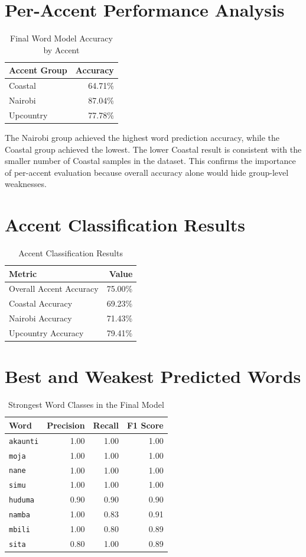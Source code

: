 \documentclass[12pt,a4paper]{report}
\begin{document}
\section{Per-Accent Performance Analysis}
\begin{table}[H]
\centering
\caption{Final Word Model Accuracy by Accent}
\begin{tabular}{lr}
\toprule
\textbf{Accent Group} & \textbf{Accuracy}\\
\midrule
Coastal & 64.71\%\\
Nairobi & 87.04\%\\
Upcountry & 77.78\%\\
\bottomrule
\end{tabular}
\end{table}

The Nairobi group achieved the highest word prediction accuracy, while the Coastal group achieved the lowest. The lower Coastal result is consistent with the smaller number of Coastal samples in the dataset. This confirms the importance of per-accent evaluation because overall accuracy alone would hide group-level weaknesses.

\section{Accent Classification Results}
\begin{table}[H]
\centering
\caption{Accent Classification Results}
\begin{tabular}{lr}
\toprule
\textbf{Metric} & \textbf{Value}\\
\midrule
Overall Accent Accuracy & 75.00\%\\
Coastal Accuracy & 69.23\%\\
Nairobi Accuracy & 71.43\%\\
Upcountry Accuracy & 79.41\%\\
\bottomrule
\end{tabular}
\end{table}

\section{Best and Weakest Predicted Words}
\begin{table}[H]
\centering
\caption{Strongest Word Classes in the Final Model}
\begin{tabular}{lrrr}
\toprule
\textbf{Word} & \textbf{Precision} & \textbf{Recall} & \textbf{F1 Score}\\
\midrule
\texttt{akaunti} & 1.00 & 1.00 & 1.00\\
\texttt{moja} & 1.00 & 1.00 & 1.00\\
\texttt{nane} & 1.00 & 1.00 & 1.00\\
\texttt{simu} & 1.00 & 1.00 & 1.00\\
\texttt{huduma} & 0.90 & 0.90 & 0.90\\
\texttt{namba} & 1.00 & 0.83 & 0.91\\
\texttt{mbili} & 1.00 & 0.80 & 0.89\\
\texttt{sita} & 0.80 & 1.00 & 0.89\\
\bottomrule
\end{tabular}
\end{table}
\end{document}
